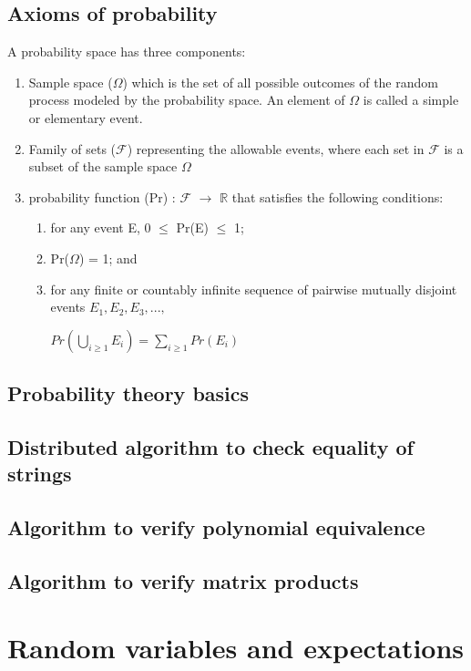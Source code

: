 \documentclass{book}
\begin{document}
\section{Axioms of probability}
A probability space has three components:
\begin{enumerate}
\item Sample space ($\Omega$) which is the set of all possible outcomes of the random process modeled by the probability space. An element of $\Omega$ is called a simple or elementary event. 
\item Family of sets ($\mathcal{F}$) representing the allowable events, where each set in $\mathcal{F}$ is a subset of the sample space $\Omega$ 
\item probability function (Pr) : $\mathcal{F}$ $\rightarrow$ $\mathbb{R}$ that satisfies the following conditions:
\begin{enumerate}
\item for any event E, 0 $\leq$ Pr(E) $\leq$ 1;
\item Pr($\Omega$) = 1; and
\item for any finite or countably infinite sequence of pairwise mutually disjoint events $E_1, E_2, E_3,...,$
\newline
\begin{center}

$Pr \left(\bigcup_{i\geq1}^{} E_i\right) = \sum_{i\geq1}^{}Pr(E_i)$
\end{center} 
\end{enumerate}
\end{enumerate}
\section{Probability theory basics}
\section{Distributed algorithm to check equality of strings}
\section{Algorithm to verify polynomial equivalence}
\section{Algorithm to verify matrix products}

\chapter{Random variables and expectations}
\end{document}
